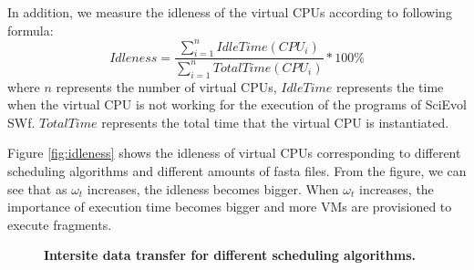 In addition, we measure the idleness of the virtual CPUs according to following formula:
\begin{equation}\label{eq:eq22}
Idleness = \frac{\sum_{i=1}^{n}IdleTime(CPU_i)} {\sum_{i=1}^{n}TotalTime(CPU_i)} * 100 \%
\end{equation} 
where $n$ represents the number of virtual CPUs, $IdleTime$ represents the time when the virtual CPU is not working for the execution of the programs of SciEvol SWf. $TotalTime$ represents the total time that the virtual CPU is instantiated. 


Figure \ref{fig:idleness} shows the idleness of virtual CPUs corresponding to different scheduling algorithms and different amounts of fasta files. From the figure, we can see that as $\omega_t$ increases, the idleness becomes bigger. When $\omega_t$ increases, the importance of execution time becomes bigger and more VMs are provisioned to execute fragments. 
\begin{figure}[htbp]
\begin{centering}
\caption{\textbf{Intersite data transfer for different scheduling algorithms.}}\label{fig:DT}
\end{centering}
\end{figure}
